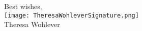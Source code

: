 \documentclass[10pt,letterpaper]{article}
\begin{document}
\begin{flushleft}


 

\end{flushleft}




\hspace*{.6\linewidth} Best wishes, \\
\hspace*{.57\linewidth} \texttt{[image: TheresaWohleverSignature.png]}  {\vspace{-9pt}} \\
\hspace*{.6\linewidth}  Theresa Wohlever
\end{document}
